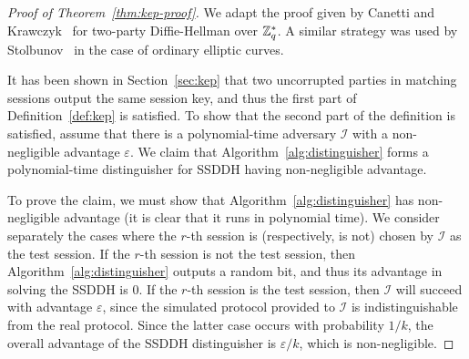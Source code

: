 \begin{proof}[Proof of Theorem~\ref{thm:kep-proof}]
We adapt the proof given by Canetti and Krawczyk~\cite[\S
  5.1]{canetti} for two-party Diffie-Hellman over ${\mathbb{Z}}_q^*$. A similar
strategy was used by Stolbunov~\cite{stolbunov-red} in the case of
ordinary elliptic curves.

It has been shown in Section~\ref{sec:kep} that two uncorrupted
parties in matching sessions output the same session key, and thus the
first part of Definition~\ref{def:kep} is satisfied. To show that the
second part of the definition is satisfied, assume that there is a
polynomial-time adversary $\mathcal{I}$ with a non-negligible advantage
$\varepsilon$. We claim that Algorithm~\ref{alg:distinguisher} forms a
polynomial-time distinguisher for SSDDH having non-negligible
advantage.

To prove the claim, we must show that
Algorithm~\ref{alg:distinguisher} has non-negligible advantage (it is
clear that it runs in polynomial time). We consider separately the
cases where the $r$-th session is (respectively, is not) chosen by
$\mathcal{I}$ as the test session. If the $r$-th session is not the
test session, then Algorithm~\ref{alg:distinguisher} outputs a random
bit, and thus its advantage in solving the SSDDH is $0$. If the
$r$-th session is the test session, then $\mathcal{I}$ will succeed
with advantage $\varepsilon$, since the simulated protocol provided to
$\mathcal{I}$ is indistinguishable from the real protocol. Since the
latter case occurs with probability $1/k$, the overall advantage of
the SSDDH distinguisher is $\varepsilon/k$, which is non-negligible.
\end{proof}

